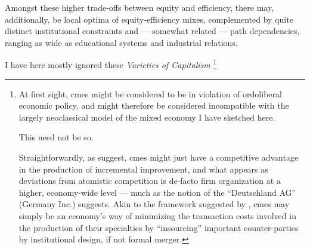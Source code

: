 \begin{enumerate}
	Amongst these higher trade-offs between equity and efficiency, there may, additionally, be local optima of equity-efficiency mixes, complemented by quite distinct institutional constraints and --- somewhat related --- path dependencies, ranging as wide as educational systems and industrial relations.

	I have here mostly ignored these \emph{Varieties of Capitalism} \citep{HallSoskice-2001-aa}
	\footnote{
		At first sight, \glspl{cme} might be considered to be in violation of ordoliberal economic policy, and might therefore be considered incompatible with the largely neoclassical model of the mixed economy I have sketched here.

		This need not be so.

		Straightforwardly, as \citeauthor{HallSoskice-2001-aa} suggest, \glspl{cme} might just have a competitive advantage in the production of incremental improvement, and what appears as deviations from atomistic competition is de-facto firm organization at a higher, economy-wide level --- much as the notion of the ``Deutschland AG'' (Germany Inc.) suggests.
		Akin to the framework suggested by \cite{Hart1990}, \glspl{cme} may simply be an economy's way of minimizing the transaction costs involved in the production of their specialties by ``insourcing'' important counter-parties by institutional design, if not formal merger.

}
\end{enumerate}
